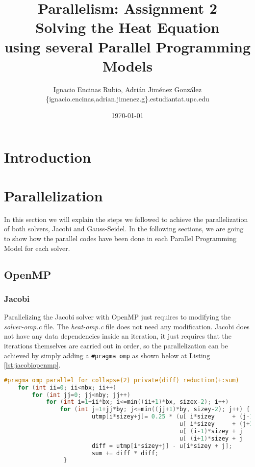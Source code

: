 \documentclass[a4paper, 10pt]{article}
\title{\textbf{Parallelism: Assignment 2\\Solving the Heat Equation \\using several Parallel Programming Models}}
\author{Ignacio Encinas Rubio, Adrián Jiménez González\\\{ignacio.encinas,adrian.jimenez.g\}.estudiantat.upc.edu}
\date{\normalsize\today{}}
\begin{document}
\maketitle

  
  

\section{Introduction}

\section{Parallelization}

In this section we will explain the steps we followed to achieve the parallelization of both solvers, Jacobi and Gauss-Seidel. In the following sections, we are going to show how the parallel codes have been done in each Parallel Programming Model for each solver.

\subsection{OpenMP}

\subsubsection{Jacobi}

  Parallelizing the Jacobi solver with OpenMP just requires to modifying the \textit{solver-omp.c} file. The \textit{heat-omp.c} file does not need any modification. 
Jacobi does not have any data dependencies inside an iteration, it just requires that the iterations themselves are carried out in order, so the parallelization can be achieved by simply adding a \texttt{\#pragma omp} as shown below at Listing \ref{lst:jacobiopenmp}.

\begin{lstlisting}[language=c, caption={OpenMP pragma for Jacobi parallelization}, label={lst:jacobiopenmp}]
    #pragma omp parallel for collapse(2) private(diff) reduction(+:sum)
    for (int ii=0; ii<nbx; ii++)
        for (int jj=0; jj<nby; jj++) 
            for (int i=1+ii*bx; i<=min((ii+1)*bx, sizex-2); i++) 
                for (int j=1+jj*by; j<=min((jj+1)*by, sizey-2); j++) {
                         utmp[i*sizey+j]= 0.25 * (u[ i*sizey     + (j-1) ]+  // left
                                                  u[ i*sizey     + (j+1) ]+  // right
                                                  u[ (i-1)*sizey + j     ]+  // top
                                                  u[ (i+1)*sizey + j     ]); // bottom
                         diff = utmp[i*sizey+j] - u[i*sizey + j];
                         sum += diff * diff; 
                 }
\end{lstlisting}
\end{document}

